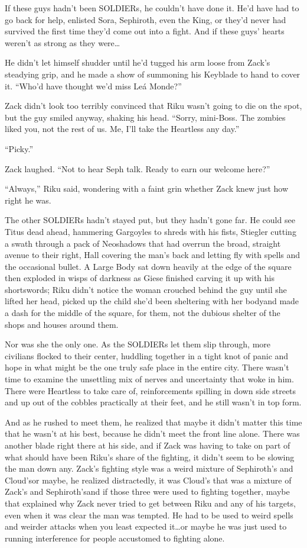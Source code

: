 If these guys hadn't been SOLDIERs, he couldn't have done it. He'd have had to go back for help, enlisted Sora, Sephiroth, even the King, or they'd never had survived the first time they'd come out into a fight. And if these guys' hearts weren't as strong as they were\ldots 

He didn't let himself shudder until he'd tugged his arm loose from Zack's steadying grip, and he made a show of summoning his Keyblade to hand to cover it. ``Who'd have thought we'd miss Leá Monde?''

Zack didn't look too terribly convinced that Riku wasn't going to die on the spot, but the guy smiled anyway, shaking his head. ``Sorry, mini-Boss. The zombies liked you, not the rest of us. Me, I'll take the Heartless any day.''

``Picky.''

Zack laughed. ``Not to hear Seph talk. Ready to earn our welcome here?''

``Always,'' Riku said, wondering with a faint grin whether Zack knew just how right he was.

The other SOLDIERs hadn't stayed put, but they hadn't gone far. He could see Titus dead ahead, hammering Gargoyles to shreds with his fists, Stiegler cutting a swath through a pack of Neoshadows that had overrun the broad, straight avenue to their right, Hall covering the man's back and letting fly with spells and the occasional bullet. A Large Body sat down heavily at the edge of the square then exploded in wisps of darkness as Giese finished carving it up with his shortswords; Riku didn't notice the woman crouched behind the guy until she lifted her head, picked up the child she'd been sheltering with her body\textemdash and made a dash for the middle of the square, for them, not the dubious shelter of the shops and houses around them.

Nor was she the only one. As the SOLDIERs let them slip through, more civilians flocked to their center, huddling together in a tight knot of panic and hope in what might be the one truly safe place in the entire city. There wasn't time to examine the unsettling mix of nerves and uncertainty that woke in him. There were Heartless to take care of, reinforcements spilling in down side streets and up out of the cobbles practically at their feet, and he still wasn't in top form.

And as he rushed to meet them, he realized that maybe it didn't matter this time that he wasn't at his best, because he didn't meet the front line alone. There was another blade right there at his side, and if Zack was having to take on part of what should have been Riku's share of the fighting, it didn't seem to be slowing the man down any. Zack's fighting style was a weird mixture of Sephiroth's and Cloud's\textemdash or maybe, he realized distractedly, it was Cloud's that was a mixture of Zack's and Sephiroth's\textemdash and if those three were used to fighting together, maybe that explained why Zack never tried to get between Riku and any of his targets, even when it was clear the man was tempted. He had to be used to weird spells and weirder attacks when you least expected it\ldots or maybe he was just used to running interference for people accustomed to fighting alone.

